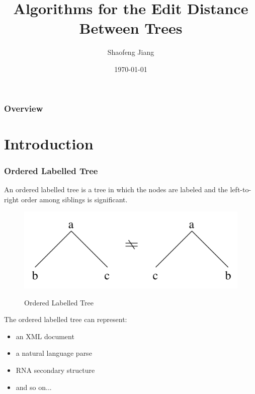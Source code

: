 \documentclass{beamer}
\title[Trees Edit Distance]{Algorithms for the Edit Distance Between Trees} %
\author{Shaofeng Jiang} %
\institute[Western University] %
{
Western University \\ %
\medskip
\textit{sjian7@uwo.ca} %
}
\date{\today} %
\begin{document}
\begin{frame}
\titlepage %
\end{frame}

\begin{frame}
\frametitle{Overview} %
\begin{multicols}{2}
  \tableofcontents
\end{multicols}
\end{frame}



\section{Introduction}
\begin{frame}
\frametitle{Ordered Labelled Tree }
An ordered labelled tree is a tree in which the nodes are labeled and the left-to-right order among siblings is significant. 
\begin{figure}
	\includegraphics[width=0.6\linewidth]{OrderedLabelledTree}
	\label{Ordered Labelled Tree} 
	\caption{Ordered Labelled Tree}
	\centering
\end{figure}
The ordered labelled tree can represent:
\begin{itemize}
\item an XML document
\item a natural language parse 
\item RNA secondary structure
\item and so on...
\end{itemize}
\end{frame}
\end{document}
